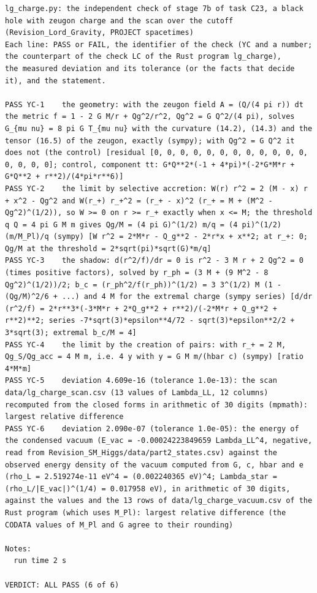 \documentclass[
  10pt,
]{article}
\begin{document}
\begin{verbatim}
lg_charge.py: the independent check of stage 7b of task C23, a black hole with zeugon charge and the scan over the cutoff (Revision_Lord_Gravity, PROJECT spacetimes)
Each line: PASS or FAIL, the identifier of the check (YC and a number; the counterpart of the check LC of the Rust program lg_charge),
the measured deviation and its tolerance (or the facts that decide it), and the statement.

PASS YC-1    the geometry: with the zeugon field A = (Q/(4 pi r)) dt the metric f = 1 - 2 G M/r + Qg^2/r^2, Qg^2 = G Q^2/(4 pi), solves G_{mu nu} = 8 pi G T_{mu nu} with the curvature (14.2), (14.3) and the tensor (16.5) of the zeugon, exactly (sympy); with Qg^2 = G Q^2 it does not (the control) [residual [0, 0, 0, 0, 0, 0, 0, 0, 0, 0, 0, 0, 0, 0, 0, 0]; control, component tt: G*Q**2*(-1 + 4*pi)*(-2*G*M*r + G*Q**2 + r**2)/(4*pi*r**6)]
PASS YC-2    the limit by selective accretion: W(r) r^2 = 2 (M - x) r + x^2 - Qg^2 and W(r_+) r_+^2 = (r_+ - x)^2 (r_+ = M + (M^2 - Qg^2)^(1/2)), so W >= 0 on r >= r_+ exactly when x <= M; the threshold q Q = 4 pi G M m gives Qg/M = (4 pi G)^(1/2) m/q = (4 pi)^(1/2) (m/M_Pl)/q (sympy) [W r^2 = 2*M*r - Q_g**2 - 2*r*x + x**2; at r_+: 0; Qg/M at the threshold = 2*sqrt(pi)*sqrt(G)*m/q]
PASS YC-3    the shadow: d(r^2/f)/dr = 0 is r^2 - 3 M r + 2 Qg^2 = 0 (times positive factors), solved by r_ph = (3 M + (9 M^2 - 8 Qg^2)^(1/2))/2; b_c = (r_ph^2/f(r_ph))^(1/2) = 3 3^(1/2) M (1 - (Qg/M)^2/6 + ...) and 4 M for the extremal charge (sympy series) [d/dr (r^2/f) = 2*r**3*(-3*M*r + 2*Q_g**2 + r**2)/(-2*M*r + Q_g**2 + r**2)**2; series -7*sqrt(3)*epsilon**4/72 - sqrt(3)*epsilon**2/2 + 3*sqrt(3); extremal b_c/M = 4]
PASS YC-4    the limit by the creation of pairs: with r_+ = 2 M, Qg_S/Qg_acc = 4 M m, i.e. 4 y with y = G M m/(hbar c) (sympy) [ratio 4*M*m]
PASS YC-5    deviation 4.609e-16 (tolerance 1.0e-13): the scan data/lg_charge_scan.csv (13 values of Lambda_LL, 12 columns) recomputed from the closed forms in arithmetic of 30 digits (mpmath): largest relative difference
PASS YC-6    deviation 2.090e-07 (tolerance 1.0e-05): the energy of the condensed vacuum (E_vac = -0.00024223849659 Lambda_LL^4, negative, read from Revision_SM_Higgs/data/part2_states.csv) against the observed energy density of the vacuum computed from G, c, hbar and e (rho_L = 2.519274e-11 eV^4 = (0.002240365 eV)^4; Lambda_star = (rho_L/|E_vac|)^(1/4) = 0.017958 eV), in arithmetic of 30 digits, against the values and the 13 rows of data/lg_charge_vacuum.csv of the Rust program (which uses M_Pl): largest relative difference (the CODATA values of M_Pl and G agree to their rounding)

Notes:
  run time 2 s

VERDICT: ALL PASS (6 of 6)
\end{verbatim}
\end{document}
